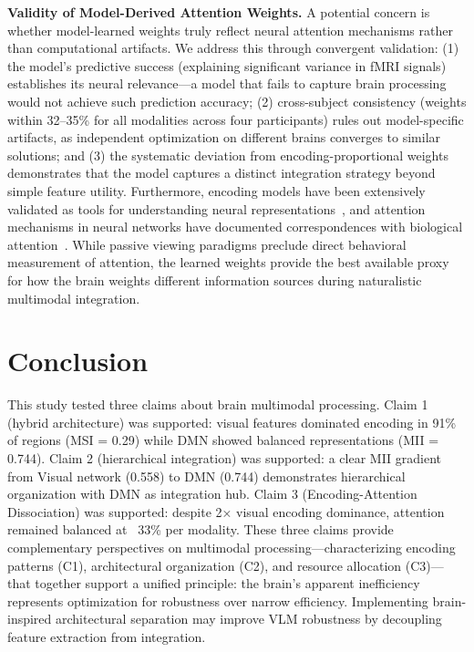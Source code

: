 \documentclass[10pt,letterpaper]{article}
\begin{document}
{\color{red}\textbf{Validity of Model-Derived Attention Weights.} A potential concern is whether model-learned weights truly reflect neural attention mechanisms rather than computational artifacts. We address this through convergent validation: (1) the model's predictive success (explaining significant variance in fMRI signals) establishes its neural relevance---a model that fails to capture brain processing would not achieve such prediction accuracy; (2) cross-subject consistency (weights within 32--35\% for all modalities across four participants) rules out model-specific artifacts, as independent optimization on different brains converges to similar solutions; and (3) the systematic deviation from encoding-proportional weights demonstrates that the model captures a distinct integration strategy beyond simple feature utility. Furthermore, encoding models have been extensively validated as tools for understanding neural representations~\citep{naselaris2011encoding,yamins2016using}, and attention mechanisms in neural networks have documented correspondences with biological attention~\citep{lindsay2020attention}. While passive viewing paradigms preclude direct behavioral measurement of attention, the learned weights provide the best available proxy for how the brain weights different information sources during naturalistic multimodal integration.}


\section{Conclusion}

This study tested three claims about brain multimodal processing. Claim 1 (hybrid architecture) was supported: visual features dominated encoding in 91\% of regions (MSI = 0.29) while DMN showed balanced representations (MII = 0.744). Claim 2 (hierarchical integration) was supported: a clear MII gradient from Visual network (0.558) to DMN (0.744) demonstrates hierarchical organization with DMN as integration hub. Claim 3 (Encoding-Attention Dissociation) was supported: despite 2× visual encoding dominance, attention remained balanced at ~33\% per modality. {\color{red}These three claims provide complementary perspectives on multimodal processing—characterizing encoding patterns (C1), architectural organization (C2), and resource allocation (C3)—that together support a unified principle:} the brain's apparent inefficiency represents optimization for robustness over narrow efficiency. Implementing brain-inspired architectural separation may improve VLM robustness by decoupling feature extraction from integration.
\end{document}
